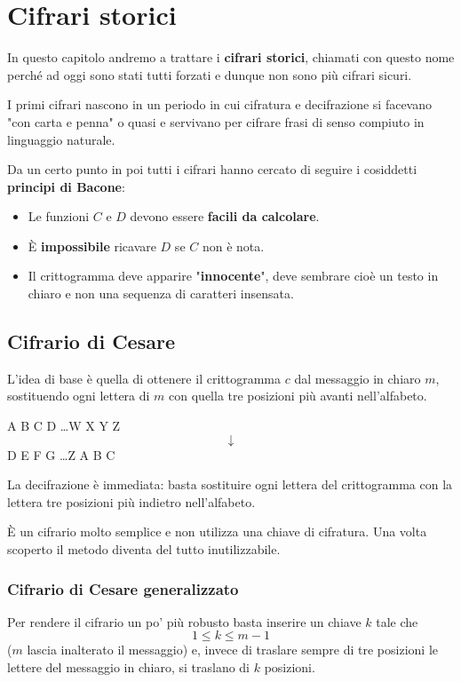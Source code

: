 \chapter{Cifrari storici}\label{storici}
In questo capitolo andremo a trattare i \textbf{cifrari storici}, chiamati con questo nome perch\'e ad oggi sono stati
tutti forzati e dunque non sono pi\`u cifrari sicuri.

I primi cifrari nascono in un periodo in cui cifratura e decifrazione si facevano "con carta e penna" o quasi e servivano
per cifrare frasi di senso compiuto in linguaggio naturale.

Da un certo punto in poi tutti i cifrari hanno cercato di seguire i cosiddetti \textbf{principi di Bacone}:
\begin{itemize}
	\item Le funzioni $C$ e $D$ devono essere \textbf{facili da calcolare}.
	\item \`E \textbf{impossibile} ricavare $D$ se $C$ non \`e nota.
	\item Il crittogramma deve apparire "\textbf{innocente}", deve sembrare cio\`e un testo in chiaro e non una sequenza
	      di caratteri insensata.
\end{itemize}

\section{Cifrario di Cesare}\label{cesare}
L'idea di base \`e quella di ottenere il crittogramma $c$ dal messaggio in chiaro $m$, sostituendo ogni lettera di $m$
con quella tre posizioni pi\`u avanti nell'alfabeto.

\begin{center}
	A B C D \dots W X Y Z
	\[ \downarrow \]
	D E F G \dots Z A B C
\end{center}
La decifrazione \`e immediata: basta sostituire ogni lettera del crittogramma con la lettera tre posizioni pi\`u indietro
nell'alfabeto.

\`E un cifrario molto semplice e non utilizza una chiave di cifratura. Una volta scoperto il metodo diventa del tutto
inutilizzabile.

\subsection{Cifrario di Cesare generalizzato}
Per rendere il cifrario un po' pi\`u robusto basta inserire un chiave $k$ tale che
\[ 1 \leq k \leq m - 1 \]
($m$ lascia inalterato il messaggio) e, invece di traslare sempre di tre posizioni le lettere del messaggio in chiaro,
si traslano di $k$ posizioni.


